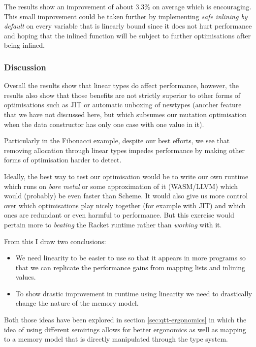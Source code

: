 \documentclass[
]{article}
\providecommand{\tightlist}{%
  \setlength{\itemsep}{0pt}\setlength{\parskip}{0pt}}
\begin{document}
The results show an improvement of about 3.3\% on average which is
encouraging. This small improvement could be taken further by
implementing \emph{safe inlining by default} on every variable that is
linearly bound since it does not hurt performance and hoping that the
inlined function will be subject to further optimisations after being
inlined.

\hypertarget{discussion}{%
\subsubsection{Discussion}\label{discussion}}

\label{subsec:discussion}

Overall the results show that linear types do affect performance,
however, the results also show that those benefits are not strictly
superior to other forms of optimisations such as JIT or automatic
unboxing of newtypes (another feature that we have not discussed here,
but which subsumes our mutation optimisation when the data constructor
has only one case with one value in it).

Particularly in the Fibonacci example, despite our best efforts, we see
that removing allocation through linear types impedes performance by
making other forms of optimisation harder to detect.

Ideally, the best way to test our optimisation would be to write our own
runtime which runs on \emph{bare metal} or some approximation of it
(WASM/LLVM) which would (probably) be even faster than Scheme. It would
also give us more control over which optimisations play nicely together
(for example with JIT) and which ones are redundant or even harmful to
performance. But this exercise would pertain more to \emph{beating} the
Racket runtime rather than \emph{working} with it.

From this I draw two conclusions:

\begin{itemize}
\tightlist
\item
  We need linearity to be easier to use so that it appears in more
  programs so that we can replicate the performance gains from mapping
  lists and inlining values.
\item
  To show drastic improvement in runtime using linearity we need to
  drastically change the nature of the memory model.
\end{itemize}

Both those ideas have been explored in section \ref{sec:qtt-ergonomics}
in which the idea of using different semirings allows for better
ergonomics as well as mapping to a memory model that is directly
manipulated through the type system.
\end{document}
